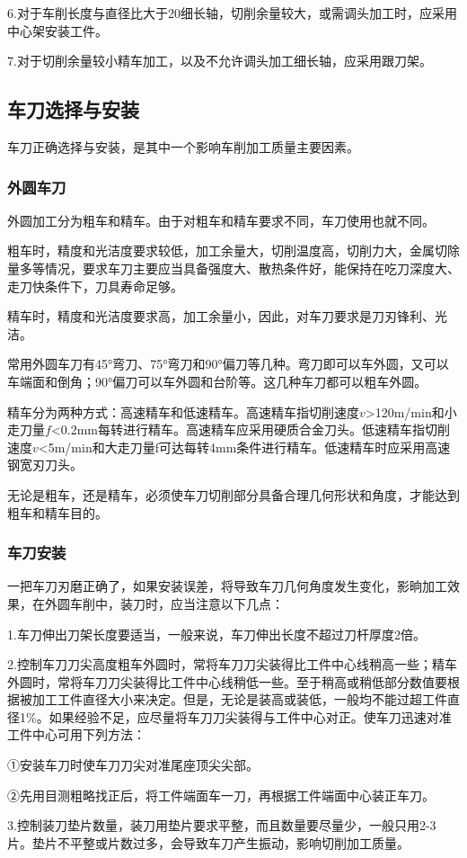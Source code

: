 \documentclass{ctexbook}
\begin{document}
6.对于车削长度与直径比大于20细长轴，切削余量较大，或需调头加工时，应采用中心架安装工件。

7.对于切削余量较小精车加工，以及不允许调头加工细长轴，应采用跟刀架。
\subsection{车刀选择与安装}
车刀正确选择与安装，是其中一个影响车削加工质量主要因素。
\subsubsection{外圆车刀}
外圆加工分为粗车和精车。由于对粗车和精车要求不同，车刀使用也就不同。

粗车时，精度和光洁度要求较低，加工余量大，切削温度高，切削力大，金属切除量多等情况，要求车刀主要应当具备强度大、散热条件好，能保持在吃刀深度大、走刀快条件下，刀具寿命足够。

精车时，精度和光洁度要求高，加工余量小，因此，对车刀要求是刀刃锋利、光洁。

常用外圆车刀有45°弯刀、75°弯刀和90°偏刀等几种。弯刀即可以车外圆，又可以车端面和倒角；90°偏刀可以车外圆和台阶等。这几种车刀都可以粗车外圆。

精车分为两种方式：高速精车和低速精车。高速精车指切削速度$v$>120m/min和小走刀量$f$<0.2mm每转进行精车。高速精车应采用硬质合金刀头。低速精车指切削速度$v$<5m/min和大走刀量f可达每转4mm条件进行精车。低速精车时应采用高速钢宽刃刀头。

无论是粗车，还是精车，必须使车刀切削部分具备合理几何形状和角度，才能达到粗车和精车目的。
\subsubsection{车刀安装}
一把车刀刃磨正确了，如果安装误差，将导致车刀几何角度发生变化，影晌加工效果，在外圆车削中，装刀时，应当注意以下几点：

1.车刀伸出刀架长度要适当，一般来说，车刀伸出长度不超过刀杆厚度2倍。

2.控制车刀刀尖高度粗车外圆时，常将车刀刀尖装得比工件中心线稍高一些；精车外圆时，常将车刀刀尖装得比工件中心线稍低一些。至于稍高或稍低部分数值要根据被加工工件直径大小来决定。但是，无论是装高或装低，一般均不能过超工件直径1\%。如果经验不足，应尽量将车刀刀尖装得与工件中心对正。使车刀迅速对准工件中心可用下列方法：

①安装车刀时使车刀刀尖对准尾座顶尖尖部。

②先用目测粗略找正后，将工件端面车一刀，再根据工件端面中心装正车刀。

3.控制装刀垫片数量，装刀用垫片要求平整，而且数量要尽量少，一般只用2-3片。垫片不平整或片数过多，会导致车刀产生振动，影响切削加工质量。
\end{document}
